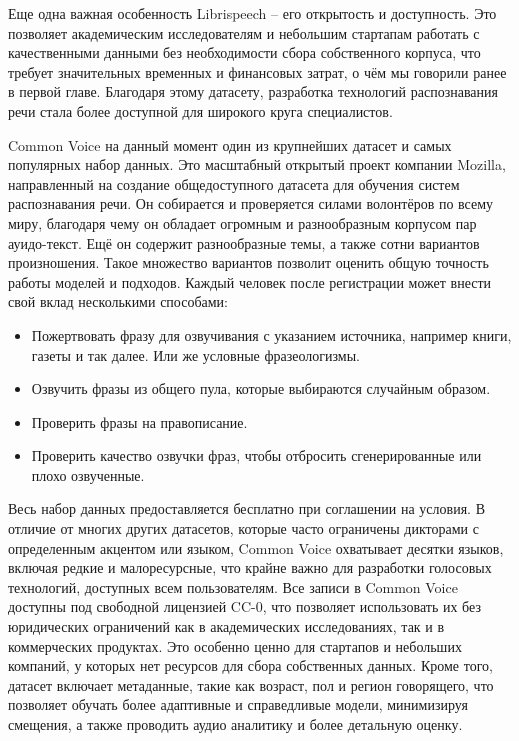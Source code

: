 Еще одна важная особенность Librispeech -- его открытость и доступность.
Это позволяет академическим исследователям и небольшим стартапам работать с качественными данными без необходимости сбора собственного корпуса, что требует значительных временных и финансовых затрат, о чём мы говорили ранее в первой главе.
Благодаря этому датасету, разработка технологий распознавания речи стала более доступной для широкого круга специалистов.

Common Voice\cite{ardila2019common} на данный момент один из крупнейших датасет и самых популярных набор данных.
Это масштабный открытый проект компании Mozilla, направленный на создание общедоступного датасета для обучения систем распознавания речи. 
Он собирается и проверяется силами волонтёров по всему миру, благодаря чему он обладает огромным и разнообразным корпусом пар ауидо-текст.
Ещё он содержит разнообразные темы, а также сотни вариантов произношения.
Такое множество вариантов позволит оценить общую точность работы моделей и подходов.
Каждый человек после регистрации может  внести свой вклад несколькими способами:
\begin{itemize}
  \item Пожертвовать фразу для озвучивания с указанием источника, например книги, газеты и так далее.
    Или же условные фразеологизмы.
  \item Озвучить фразы из общего пула, которые выбираются случайным образом.
  \item Проверить фразы на правописание.
  \item Проверить качество озвучки фраз, чтобы отбросить сгенерированные или плохо озвученные.
\end{itemize}
Весь набор данных предоставляется бесплатно при соглашении на условия.
В отличие от многих других датасетов, которые часто ограничены дикторами с определенным акцентом или языком, Common Voice охватывает десятки языков, включая редкие и малоресурсные, что крайне важно для разработки голосовых технологий, доступных всем пользователям.
Все записи в Common Voice доступны под свободной лицензией CC-0, что позволяет использовать их без юридических ограничений как в академических исследованиях, так и в коммерческих продуктах.
Это особенно ценно для стартапов и небольших компаний, у которых нет ресурсов для сбора собственных данных.
Кроме того, датасет включает метаданные, такие как возраст, пол и регион говорящего, что позволяет обучать более адаптивные и справедливые модели, минимизируя смещения, а также проводить аудио аналитику и более детальную оценку.

